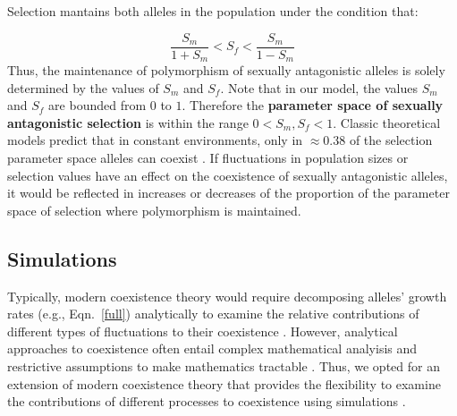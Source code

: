 Selection mantains both alleles in the population under the condition that:

\begin{equation}
\frac{S_{m}}{1+S_{m}} < S_{f} < \frac{S_{m}}{1-S_{m}}
\label{selection}
\end{equation}
\citep{kidwell1977regions,pamilo1979genic,patten2010fitness,connallon_evolutionary_2018}
Thus, the maintenance of polymorphism of sexually antagonistic alleles is solely determined by the values of $S_{m}$ and $S_{f}$. Note that in our model, the values $S_{m}$ and $S_{f}$ are bounded from $0$ to $1$. Therefore the \textbf{parameter space of sexually antagonistic selection} is within the range $ 0< S_{m}, S_{f} < 1$. Classic theoretical models predict that in constant environments, only in $\approx 0.38$ of the selection parameter space alleles can coexist \citep{kidwell1977regions,pamilo1979genic,connallon_evolutionary_2018}.  If fluctuations in population sizes or selection values have an effect on the coexistence of sexually antagonistic alleles, it would be reflected in increases or decreases of the proportion of the parameter space of selection where polymorphism is maintained.



\subsection*{Simulations}

Typically, modern coexistence theory would require decomposing alleles' growth rates (e.g., Eqn.~\ref{full}) analytically to examine the relative contributions of different types of fluctuations to their coexistence \citep{chesson1994multispecies,Chesson2000,barabas_chessons_2018}. However, analytical approaches to coexistence often entail complex mathematical analyisis and restrictive assumptions to make mathematics tractable \citep{ellner_expanded_2019}. Thus, we opted for an extension of modern coexistence theory that provides the flexibility to examine the contributions of different processes to coexistence using simulations \citep{ellner_expanded_2019,ellner2016quantify, shoemaker2020}.



